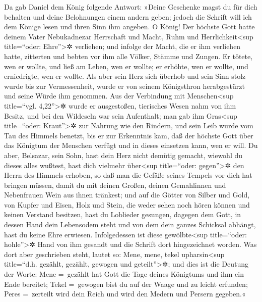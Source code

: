 Da gab Daniel dem König folgende Antwort: »Deine
Geschenke magst du für dich behalten und deine Belohnungen einem andern
geben; jedoch die Schrift will ich dem Könige lesen und ihren Sinn ihm
angeben. O König! Der höchste Gott hatte deinem Vater
Nebukadnezar Herrschaft und Macht, Ruhm und Herrlichkeit\textless sup
title=``oder: Ehre''\textgreater✲ verliehen; und infolge
der Macht, die er ihm verliehen hatte, zitterten und bebten vor ihm alle
Völker, Stämme und Zungen. Er tötete, wen er wollte, und ließ am Leben,
wen er wollte; er erhöhte, wen er wollte, und erniedrigte, wen er
wollte. Als aber sein Herz sich überhob und sein Sinn
stolz wurde bis zur Vermessenheit, wurde er von seinem Königsthron
herabgestürzt und seine Würde ihm genommen. Aus der
Verbindung mit Menschen\textless sup title=``vgl. 4,22''\textgreater✲
wurde er ausgestoßen, tierisches Wesen nahm von ihm Besitz, und bei den
Wildeseln war sein Aufenthalt; man gab ihm Gras\textless sup
title=``oder: Kraut''\textgreater✲ zur Nahrung wie den Rindern, und sein
Leib wurde vom Tau des Himmels benetzt, bis er zur Erkenntnis kam, daß
der höchste Gott über das Königtum der Menschen verfügt und in dieses
einsetzen kann, wen er will. Du aber, Belsazar, sein
Sohn, hast dein Herz nicht demütig gemacht, wiewohl du dieses alles
wußtest, hast dich vielmehr über\textless sup
title=``oder: gegen''\textgreater✲ den Herrn des Himmels erhoben, so daß
man die Gefäße seines Tempels vor dich hat bringen müssen, damit du mit
deinen Großen, deinen Gemahlinnen und Nebenfrauen Wein aus ihnen
tränkest; und auf die Götter von Silber und Gold, von Kupfer und Eisen,
Holz und Stein, die weder sehen noch hören können und keinen Verstand
besitzen, hast du Loblieder gesungen, dagegen dem Gott, in dessen Hand
dein Lebensodem steht und von dem dein ganzes Schicksal abhängt, hast du
keine Ehre erwiesen. Infolgedessen ist diese
gewölbte\textless sup title=``oder: hohle''\textgreater✲ Hand von ihm
gesandt und die Schrift dort hingezeichnet worden. Was
dort aber geschrieben steht, lautet so: Mene, mene, tekel
upharsin\textless sup title=``d.h. gezählt, gezählt, gewogen und
geteilt''\textgreater✲; und dies ist die Deutung der
Worte: Mene =~gezählt hat Gott die Tage deines Königtums und ihm ein
Ende bereitet; Tekel =~gewogen bist du auf der Waage und
zu leicht erfunden; Peres =~zerteilt wird dein Reich und
wird den Medern und Persern gegeben.«

